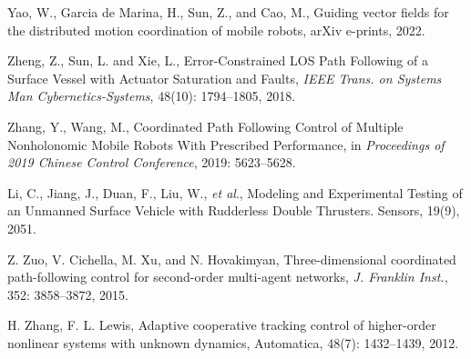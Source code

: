 \documentclass[a4paper,fleqn]{cas-dc}
\begin{document}
\begin{thebibliography}{0}
	 Yao, W., Garcia de Marina, H., Sun, Z., and Cao, M., Guiding vector fields for the distributed motion coordination of mobile robots, arXiv e-prints, 2022.
	
	 Zheng, Z., Sun, L. and Xie, L., Error-Constrained LOS Path Following of a Surface Vessel with Actuator Saturation and Faults, \emph{IEEE Trans. on Systems Man Cybernetics-Systems}, 48(10): 1794--1805, 2018.
	
	 Zhang, Y., Wang, M., Coordinated Path Following Control of Multiple Nonholonomic Mobile Robots With Prescribed Performance, in \emph{Proceedings of 2019 Chinese Control Conference}, 2019: 5623--5628. 
	
	 Li, C., Jiang, J., Duan, F., Liu, W., \emph{et al}., Modeling and Experimental Testing of an Unmanned Surface Vehicle with Rudderless Double Thrusters. Sensors, 19(9), 2051.
	
	 Z. Zuo, V. Cichella, M. Xu, and N. Hovakimyan, Three-dimensional coordinated path-following control for second-order multi-agent networks, \emph{J. Franklin Inst.}, 352: 3858--3872, 2015.
	
	 H. Zhang, F. L. Lewis, Adaptive cooperative tracking control of higher-order nonlinear systems with unknown dynamics, Automatica, 48(7): 1432--1439, 2012.
	
\end{thebibliography}
\end{document}
